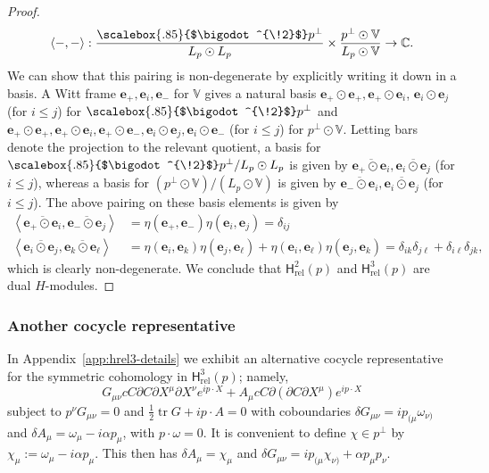 \documentclass[11pt,reqno,a4paper,final]{amsart}
\newcommand\sym[1]{\scalebox{.85}{$\bigodot^{\!#1}$}}
\theoremstyle{plain}
\theoremstyle{definition}
\renewcommand{\d}{\partial}
\newcommand{\be}{\boldsymbol{e}}
\newcommand{\Hrel}{\mathsf{H}_{\mathrm{rel}}}
\newcommand{\tr}{\operatorname{tr}}
\newcommand{\VV}{\mathbb{V}}
\newcommand{\CC}{\mathbb{C}}
\newcommand{\1}{\mathbb{1}}
\numberwithin{equation}{section}
\begin{document}
\begin{proof}
\begin{equation}
    \left<-,-\right> : \dfrac{\sym{2} p^\perp}{L_p \odot L_p} \times \dfrac{p^\perp \odot \VV}{L_p \odot \VV} \to \CC.
  \end{equation}
  We can show that this pairing is non-degenerate by explicitly
  writing it down in a basis.  A Witt frame $\be_+,\be_i,
  \be_-$ for $\VV$ gives a natural basis $\be_+ \odot \be_+, \be_+
  \odot \be_i$, $\be_i \odot \be_j$ (for $i\leq j$) for $\sym{2}p^\perp$
  and $\be_+\odot \be_+, \be_+ \odot \be_i, \be_+\odot \be_-, \be_i
  \odot \be_j, \be_i \odot \be_-$ (for $i\leq j$) for $p^\perp \odot
  \VV$. Letting bars denote the projection to the relevant quotient, a
  basis for $\sym{2}p^\perp/L_p \odot L_p$ is given by
  $\overline{\be_+ \odot \be_i}, \overline{\be_i \odot \be_j}$ (for 
  $i\leq j$), whereas a basis for $(p^\perp \odot \VV)/(L_p \odot
  \VV)$ is given by $\overline{\be_- \odot \be_i}, \overline{\be_i
    \odot \be_j}$ (for $i\leq j$).  The above pairing on these basis
  elements is given by
  \begin{equation}
    \begin{split}
      \left<\overline{\be_+ \odot \be_i}, \overline{\be_- \odot
          \be_j}\right> &= \eta(\be_+,\be_-) \eta(\be_i, \be_j) = \delta_{ij}\\
      \left<\overline{\be_i \odot \be_j}, \overline{\be_k \odot
          \be_\ell}\right> &= \eta(\be_i, \be_k) \eta(\be_j,\be_\ell)
      +  \eta(\be_i, \be_\ell) \eta(\be_j,\be_k) = \delta_{ik}\delta_{j\ell} +  \delta_{i\ell} \delta_{jk},
  \end{split}
\end{equation}
which is clearly non-degenerate.  We conclude that $\Hrel^2(p)$ and
$\Hrel^3(p)$ are dual $H$-modules.
\end{proof}

\subsubsection{Another cocycle representative}
\label{sec:other-cocycle-reps}

In Appendix~\ref{app:hrel3-details} we exhibit an alternative cocycle
representative for the symmetric cohomology in $\Hrel^3(p)$; namely,
\begin{equation}
  \label{eq:hrel3-symmetric-alt-cocycle}
  G_{\mu\nu} c C \d C \d X^\mu \d X^\nu e^{i p \cdot X} + A_\mu c C  \d (\d C \d X^\mu) e^{i p\cdot X}
\end{equation}
subject to $p^\nu G_{\mu\nu} = 0$ and $\tfrac12 \tr G + i p \cdot A =
0$ with coboundaries $\delta G_{\mu\nu} = i p_{(\mu} \omega_{\nu)}$
and $\delta A_\mu = \omega_\mu -i \alpha p_\mu$, with $p\cdot \omega
= 0$.  It is convenient to define $\chi \in p^\perp$ by $\chi_\mu :=
\omega_\mu - i \alpha p_\mu$.  This then has $\delta A_\mu = \chi_\mu$
and $\delta G_{\mu\nu} = i p_{(\mu} \chi_{\nu)} + \alpha p_\mu p_\nu$.
\end{document}
